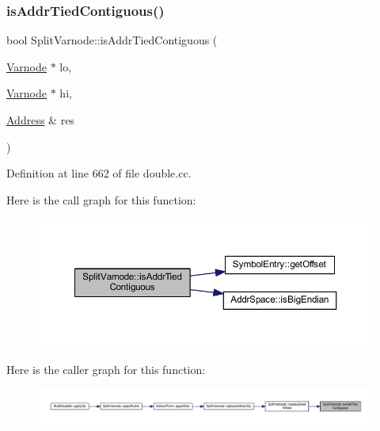 \subsubsection{\texorpdfstring{isAddrTiedContiguous()}{isAddrTiedContiguous()}}
{\footnotesize\ttfamily bool Split\+Varnode\+::is\+Addr\+Tied\+Contiguous (\begin{DoxyParamCaption}\item[{\mbox{\hyperlink{class_varnode}{Varnode}} $\ast$}]{lo,  }\item[{\mbox{\hyperlink{class_varnode}{Varnode}} $\ast$}]{hi,  }\item[{\mbox{\hyperlink{class_address}{Address}} \&}]{res }\end{DoxyParamCaption})\hspace{0.3cm}{\ttfamily [static]}}



Definition at line 662 of file double.\+cc.

Here is the call graph for this function\+:
\nopagebreak
\begin{figure}[H]
\begin{center}
\leavevmode
\includegraphics[width=350pt]{class_split_varnode_ac857d72933606a431013da7fb0883ddf_cgraph}
\end{center}
\end{figure}
Here is the caller graph for this function\+:
\nopagebreak
\begin{figure}[H]
\begin{center}
\leavevmode
\includegraphics[width=350pt]{class_split_varnode_ac857d72933606a431013da7fb0883ddf_icgraph}
\end{center}
\end{figure}
\mbox{\label{class_split_varnode_aab8d8d52dc075984f318ae17dc6522dd}} 
